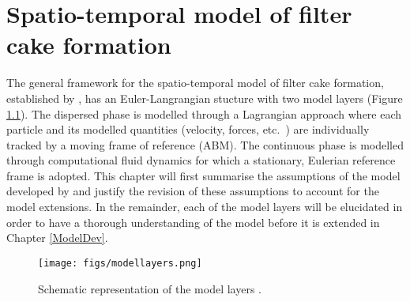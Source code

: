 \hyphenation{}
\chapter[Spatio-temporal model of filter cake formation]%
{Spatio-temporal model of filter cake formation \label{spatModel}}
The general framework for the spatio-temporal model of filter cake formation, established by \cite{Ghijs2014}, has an Euler-Langrangian stucture with two model layers (Figure \ref{fg:modellayers}). The dispersed phase is modelled through a Lagrangian approach where each particle and its modelled quantities (velocity, forces, etc.\ ) are individually tracked by a moving frame of reference (\gls{ABM}). The continuous phase is modelled through computational fluid dynamics for which a stationary, Eulerian reference frame is adopted.
This chapter will first summarise the assumptions of the model developed by \cite{Ghijs2014} and justify the revision of these assumptions to account for the model extensions. In the remainder, each of the model layers will be elucidated in order to have a thorough understanding of the model before it is extended  in Chapter \ref{ModelDev}.

\begin{figure}[]
    \centering
    \texttt{[image: figs/modellayers.png]}
    \caption{Schematic representation of the model layers \citep{Ghijs2014}.}
    \label{fg:modellayers}
\end{figure}

